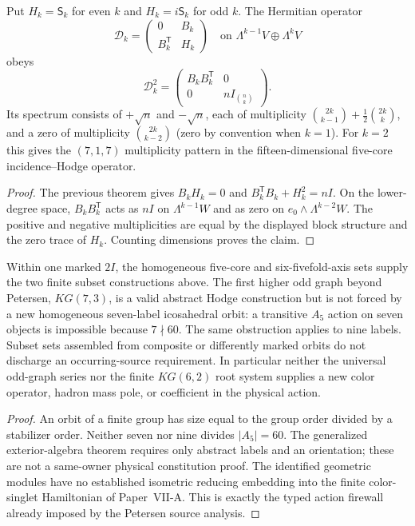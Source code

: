 \documentclass[11pt]{article}
\begin{document}
\begin{corollary}
\label{p1:cor:kneser-universal-dirac}
Put $H_k=\mathsf S_k$ for even $k$ and $H_k=i\mathsf S_k$ for odd
$k$. The Hermitian operator
\[
 \mathscr D_k=\begin{pmatrix}0&B_k\\B_k^{\mathsf T}&H_k\end{pmatrix}
 \quad\text{on }\Lambda^{k-1}V\oplus\Lambda^kV
\]
obeys
\[
 \boxed{\mathscr D_k^2=\begin{pmatrix}
 B_kB_k^{\mathsf T}&0\\0&nI_{\binom nk}
 \end{pmatrix}.}
\]
Its spectrum consists of $+\sqrt n$ and $-\sqrt n$, each of
multiplicity $\binom{2k}{k-1}+\tfrac12\binom{2k}{k}$, and a zero
of multiplicity $\binom{2k}{k-2}$ (zero by convention when $k=1$).
For $k=2$ this gives the $(7,1,7)$ multiplicity pattern in the
fifteen-dimensional five-core incidence--Hodge operator.
\end{corollary}
\begin{proof}
The previous theorem gives $B_kH_k=0$ and
$B_k^{\mathsf T}B_k+H_k^2=nI$. On the lower-degree space,
$B_kB_k^{\mathsf T}$ acts as $nI$ on
$\Lambda^{k-1}W$ and as zero on
$e_0\wedge\Lambda^{k-2}W$. The positive and negative
multiplicities are equal by the displayed block structure and the
zero trace of $H_k$. Counting dimensions proves the claim.
\end{proof}

\begin{proposition}
\label{p1:prop:kneser-five-six-native-limit}
Within one marked $2I$, the homogeneous five-core and six-fivefold-axis
sets supply the two finite subset constructions above. The first
higher odd graph beyond Petersen, $KG(7,3)$, is a valid abstract
Hodge construction but is not forced by a new homogeneous seven-label
icosahedral orbit: a transitive $A_5$ action on seven objects is
impossible because $7\nmid60$. The same obstruction applies to
nine labels. Subset sets assembled from composite or differently
marked orbits do not discharge an occurring-source requirement.
In particular neither the universal odd-graph series nor the finite
$KG(6,2)$ root system supplies a new color operator, hadron mass pole,
or coefficient in the physical action.
\end{proposition}
\begin{proof}
An orbit of a finite group has size equal to the group order divided
by a stabilizer order. Neither seven nor nine divides $|A_5|=60$.
The generalized exterior-algebra theorem requires only abstract
labels and an orientation; these are not a same-owner physical
constitution proof. The identified geometric modules have no
established isometric reducing embedding into the finite color-singlet
Hamiltonian of Paper~VII-A. This is exactly the typed action firewall
already imposed by the Petersen source analysis.
\end{proof}
\end{document}
